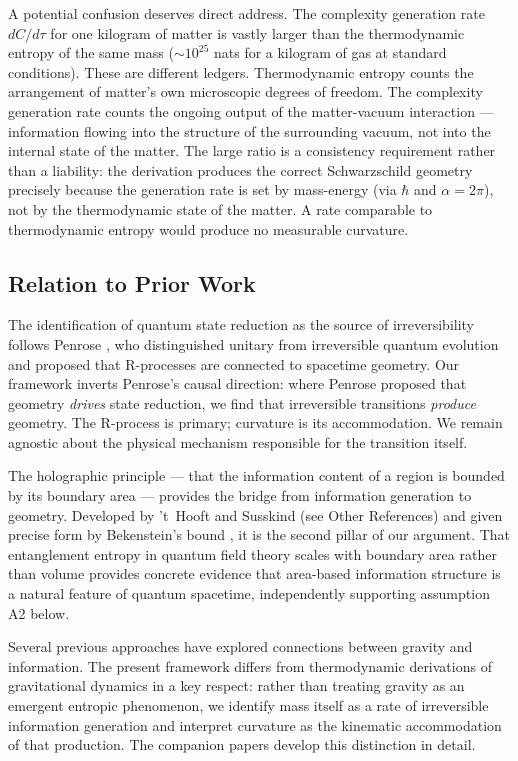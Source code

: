 \documentclass[12pt]{article}
\begin{document}
A potential confusion deserves direct address.
The complexity generation rate $dC/d\tau$ for one kilogram of matter is
vastly larger than the thermodynamic entropy of the same mass
($\sim 10^{25}$ nats for a kilogram of gas at standard conditions).
These are different ledgers.
Thermodynamic entropy counts the arrangement of matter's own microscopic
degrees of freedom.
The complexity generation rate counts the ongoing output of the
matter-vacuum interaction --- information flowing into the structure of
the surrounding vacuum, not into the internal state of the matter.
The large ratio is a consistency requirement rather than a liability:
the derivation produces the correct Schwarzschild geometry precisely
because the generation rate is set by mass-energy (via $\hbar$ and
$\alpha = 2\pi$), not by the thermodynamic state of the matter.
A rate comparable to thermodynamic entropy would produce no measurable
curvature.

\subsection{Relation to Prior Work}
\label{sec:prior}

The identification of quantum state reduction as the source of
irreversibility follows Penrose \cite{Penrose1994, HawkingPenrose1996},
who distinguished unitary from irreversible quantum evolution and
proposed that R-processes are connected to spacetime geometry.
Our framework inverts Penrose's causal direction: where Penrose proposed
that geometry \emph{drives} state reduction, we find that irreversible
transitions \emph{produce} geometry.
The R-process is primary; curvature is its accommodation.
We remain agnostic about the physical mechanism responsible for the
transition itself.

The holographic principle --- that the information content of a region
is bounded by its boundary area --- provides the bridge from information
generation to geometry.
Developed by 't~Hooft \cite{tHooft1993} and Susskind (see Other
References) and given precise form by Bekenstein's bound
\cite{Bekenstein1973, Bekenstein1981}, it is the second pillar of our
argument.
That entanglement entropy in quantum field theory scales with boundary
area rather than volume \cite{Srednicki1993} provides concrete evidence
that area-based information structure is a natural feature of quantum
spacetime, independently supporting assumption A2 below.

Several previous approaches have explored connections between gravity
and information.
The present framework differs from thermodynamic derivations of
gravitational dynamics in a key respect: rather than treating gravity
as an emergent entropic phenomenon, we identify mass itself as a rate
of irreversible information generation and interpret curvature as the
kinematic accommodation of that production.
The companion papers develop this distinction in detail.
\end{document}
